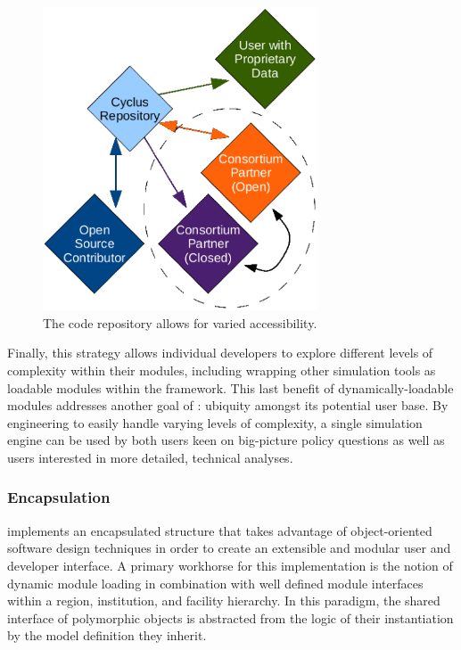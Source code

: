 \begin{figure}[hp!]
  \begin{center}
    \includegraphics[height=9cm]{./chapters/paradigm/openness.eps}
  \end{center}
  \caption{The \Cyclus code repository allows for varied accessibility.}
  \label{fig:repo}
\end{figure}

Finally, this strategy allows individual developers to
explore different levels of complexity within their modules, including
wrapping other simulation tools as loadable modules within the \Cyclus 
framework. This last benefit of dynamically-loadable modules addresses 
another goal of \Cyclus: ubiquity amongst its potential user base. By
engineering \Cyclus to easily handle varying levels of complexity, a single
simulation engine can be used by both users keen on big-picture policy
questions as well as users interested in more detailed, technical
analyses.

\subsubsection{Encapsulation}

\Cyclus implements an encapsulated structure that takes advantage of 
object-oriented software design techniques in order to create an 
extensible and modular user and developer interface. A primary 
workhorse for this implementation is the notion of dynamic module 
loading in combination with  well defined module interfaces within 
a region, institution, and facility  hierarchy. In this paradigm, 
the shared interface of polymorphic objects is abstracted from the 
logic of their instantiation by the model definition they inherit.  

